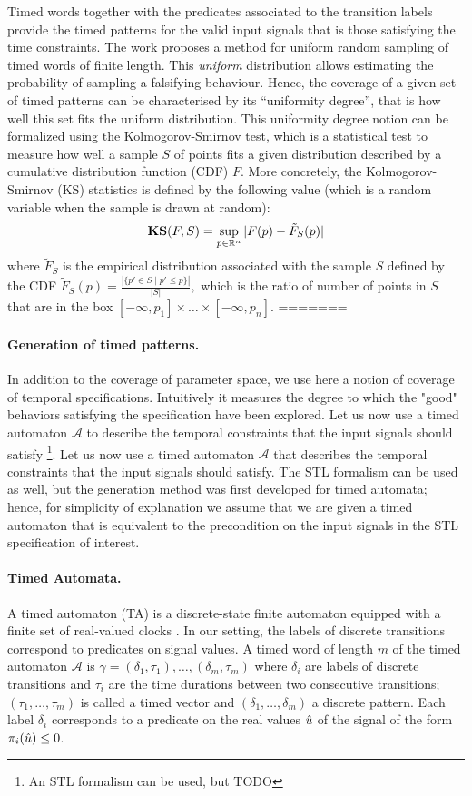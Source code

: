 Timed words together with the predicates associated to the transition labels provide the timed patterns for the valid input signals that is those satisfying the time constraints. The work \cite{BBBK16} proposes a method for uniform random sampling of timed words of finite length. This \emph{uniform} distribution allows estimating the probability of sampling a falsifying behaviour. Hence, the coverage of a given set of timed patterns can be characterised by its ``uniformity degree'', that is how well this set fits the uniform distribution. This uniformity degree notion can be formalized using the Kolmogorov-Smirnov test, which is a statistical test to measure how well a sample $S$ of points fits a given distribution described by a cumulative distribution function (CDF) $F$. More concretely, the Kolmogorov-Smirnov (KS) statistics is defined by the following value (which is a random variable when the sample is drawn at random):
$$\mathbf{KS}(F,S)=\sup_{p\in\mathbb{R}^n}|F(p)-\tilde F_S(p)|$$
where $\tilde F_S$ is the empirical distribution associated with the sample $S$ defined by the CDF 
$\tilde F_S(p)=\displaystyle{\frac{|\{p'\in S\mid  p'\leq p\}|}{|S|}},$ which is the ratio of number of points in $S$ that are in the box $[-\infty, p_1]\times \ldots\times [-\infty, p_n].$ 
=======
\paragraph{Generation of timed patterns.} 
In addition to the coverage of parameter space, we use here a notion of coverage of temporal specifications. Intuitively it measures the degree to which the "good" behaviors satisfying the specification have been explored. Let us now use a timed automaton $\mathcal{A}$ to describe the temporal constraints that the input signals should satisfy \footnote{An STL formalism can be used, but {\color{red}TODO}}.  Let us now use a timed automaton $\mathcal{A}$ that describes the temporal constraints that the input signals should satisfy. The STL formalism can be used as well, but the generation method  was first developed for timed automata; hence, for simplicity of explanation we assume that we are given a timed automaton that is equivalent to the precondition on the input signals in the STL specification of interest. 

\paragraph{Timed Automata.} 
A timed automaton (TA) is a discrete-state finite automaton equipped with a finite set of real-valued clocks \cite{Alur94}.
In our setting, the labels of discrete transitions correspond to predicates on signal values.
A timed word of length $m$ of the timed automaton $\mathcal{A}$ is $\gamma = (\delta_1, \tau_1), \ldots, (\delta_m, \tau_m)$ where $\delta_i$ are labels of discrete transitions and $\tau_i$ are the time durations between two consecutive transitions; $(\tau_1, \ldots, \tau_m)$ is called a timed vector and $(\delta_1, \ldots, \delta_m)$ a discrete pattern. Each label $\delta_i$ corresponds to a predicate on the real values $\hat{u}$ of the signal of the form $\pi_i(\hat{u}) \le 0$.

